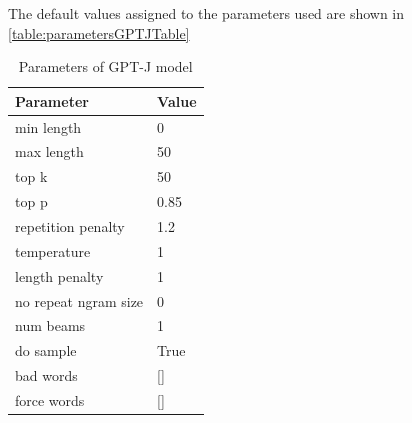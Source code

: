 \documentclass{article}
\begin{document}
The default values assigned to the parameters used are shown in \autoref{table:parametersGPTJTable}
\begin{table}[h] 
\centering
\begin{tabular}{|l|l|}
\hline
Parameter          & Value \\ \hline
min length         & 0    \\ 
max length         & 50    \\ 
top k              & 50    \\
top p              & 0.85  \\
repetition penalty & 1.2   \\
temperature        & 1     \\
length penalty     & 1     \\
no repeat ngram size     & 0     \\
num beams &  1 \\
do sample & True \\
bad words & [\space] \\
force words & [\space] \\ \hline
\end{tabular}
\caption{Parameters of GPT-J model}\label{table:parametersGPTJTable}
\end{table}
\end{document}
